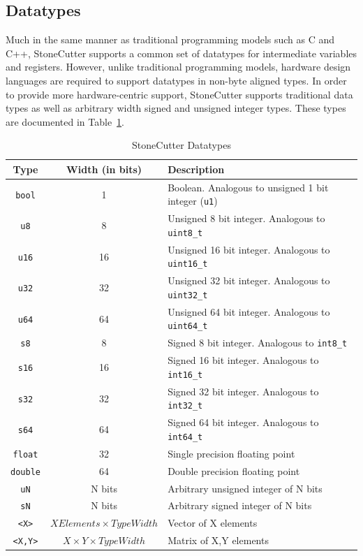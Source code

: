 \documentclass{article}
\begin{document}
\clearpage
\subsection{Datatypes}
\label{sec:Datatypes}

Much in the same manner as traditional programming models such as C and C++, StoneCutter 
supports a common set of datatypes for intermediate variables and registers.  However, unlike 
traditional programming models, hardware design languages are required to support datatypes 
in non-byte aligned types.  In order to provide more hardware-centric support, StoneCutter supports 
traditional data types as well as arbitrary width signed and unsigned integer types.  These types are 
documented in Table~\ref{tab:datatypes}. 

\begin{table}[h]
\begin{center}
\caption{StoneCutter Datatypes}
\vspace{0.125in}
\label{tab:datatypes}
\begin{tabular}{|c|c|l|}
\hline
\textbf{Type} & \textbf{Width (in bits)} & \textbf{Description}\\
\hline
\texttt{bool} & 1 & Boolean.  Analogous to unsigned 1 bit integer (\texttt{u1})\\
\hline
\texttt{u8} & 8 & Unsigned 8 bit integer. Analogous to \texttt{uint8\_t}\\
\hline
\texttt{u16} & 16 & Unsigned 16 bit integer. Analogous to \texttt{uint16\_t}\\
\hline
\texttt{u32} & 32 & Unsigned 32 bit integer. Analogous to \texttt{uint32\_t}\\
\hline
\texttt{u64} & 64 & Unsigned 64 bit integer. Analogous to \texttt{uint64\_t}\\
\hline
\texttt{s8} & 8 & Signed 8 bit integer. Analogous to \texttt{int8\_t}\\
\hline
\texttt{s16} & 16 & Signed 16 bit integer. Analogous to \texttt{int16\_t}\\
\hline
\texttt{s32} & 32 & Signed 32 bit integer. Analogous to \texttt{int32\_t}\\
\hline
\texttt{s64} & 64 & Signed 64 bit integer. Analogous to \texttt{int64\_t}\\
\hline
\texttt{float} & 32 & Single precision floating point\\
\hline
\texttt{double} & 64 & Double precision floating point\\
\hline
\texttt{uN} & N bits & Arbitrary unsigned integer of N bits\\
\hline
\texttt{sN} & N bits & Arbitrary signed integer of N bits\\
\hline
\texttt{<X>} & $X Elements \times Type Width$ & Vector of X elements\\
\hline
\texttt{<X,Y>} & $X \times Y \times Type Width$ & Matrix of X,Y elements\\
\hline
\end{tabular}
\end{center}
\end{table}
\end{document}
